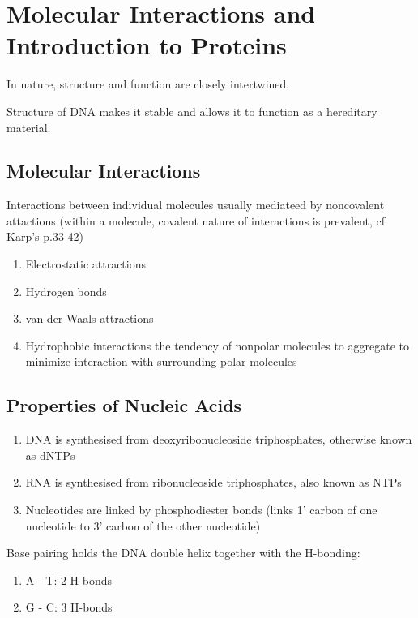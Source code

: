 \documentclass[11pt]{scrartcl}
\begin{document}
\section{Molecular Interactions and Introduction to Proteins}

In nature, structure and function are closely intertwined.

Structure of DNA makes it stable and allows it to function as a
hereditary material.

\subsection{Molecular Interactions}
 Interactions between individual molecules usually mediateed by
noncovalent attactions (within a molecule, covalent nature of
interactions is prevalent, cf Karp's p.33-42)

\begin{enumerate}
\item\label{item:20} Electrostatic attractions

\item\label{item:19} Hydrogen bonds

\item\label{item:21} van der Waals attractions

\item\label{item:22} Hydrophobic interactions the tendency of nonpolar
  molecules to aggregate to minimize interaction with surrounding
  polar molecules
\end{enumerate}
\subsection{Properties of Nucleic Acids}

\begin{enumerate}
\item\label{item:23} DNA is synthesised from deoxyribonucleoside
  triphosphates, otherwise known as dNTPs

\item\label{item:24} RNA is synthesised from ribonucleoside
  triphosphates, also known as NTPs

\item\label{item:25} Nucleotides are linked by phosphodiester bonds
  (links 1' carbon of one nucleotide to 3' carbon of the other
  nucleotide)
\end{enumerate}

Base pairing holds the DNA double helix together with the H-bonding:
\begin{enumerate}
\item\label{item:27} A - T: 2 H-bonds

\item\label{item:28} G - C: 3 H-bonds
\end{enumerate}
\end{document}

